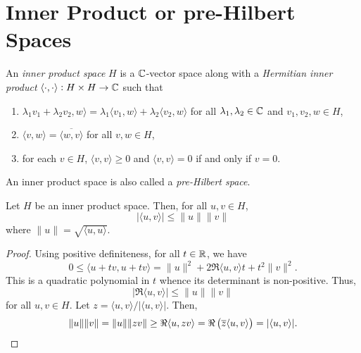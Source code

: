 \section{Inner Product or pre-Hilbert Spaces}

\begin{definition}
    An \emph{inner product space} $H$ is a $\mathbb{C}$-vector space along with a \emph{Hermitian inner product} $\langle\cdot,\cdot\rangle: H\times H\to\mathbb{C}$ such that 
    \begin{enumerate}[label=(\alph*)]
        \item $\lambda_1v_1 + \lambda_2v_2, w\rangle = \lambda_1\langle v_1,w\rangle + \lambda_2\langle v_2,w\rangle$ for all $\lambda_1,\lambda_2\in\mathbb{C}$ and $v_1,v_2,w\in H$,
        \item $\langle v,w\rangle = \overline{\langle w,v\rangle}$ for all $v,w\in H$,
        \item for each $v\in H$, $\langle v,v\rangle\ge 0$ and $\langle v,v\rangle = 0$ if and only if $v = 0$.
    \end{enumerate}
    An inner product space is also called a \emph{pre-Hilbert space}.
\end{definition}

\begin{theorem}
    Let $H$ be an inner product space. Then, for all $u,v\in H$, 
    \begin{equation*}
        |\langle u,v\rangle|\le\|u\|\|v\|
    \end{equation*}
    where $\|u\| = \sqrt{\langle u,u\rangle}$.
\end{theorem}
\begin{proof}
    Using positive definiteness, for all $t\in\mathbb{R}$, we have 
    \begin{equation*}
        0\le\langle u + tv, u + tv\rangle = \|u\|^2 + 2\Re\langle u,v\rangle t + t^2\|v\|^2.
    \end{equation*}
    This is a quadratic polynomial in $t$ whence its determinant is non-positive. Thus, 
    \begin{equation*}
        |\Re\langle u,v\rangle|\le\|u\|\|v\|
    \end{equation*}
    for all $u,v\in H$. Let $z = \langle u,v\rangle/|\langle u,v\rangle|$. Then, 
    \begin{equation*}
        \|u\|\|v\| = \|u\|\|zv\|\ge\Re\langle u,zv\rangle = \Re\left(\overline{z}\langle u,v\rangle\right) = |\langle u,v\rangle|.\qedhere
    \end{equation*}
\end{proof}

